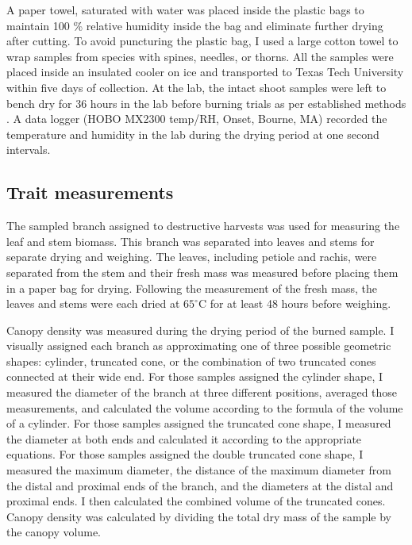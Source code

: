 \documentclass{ttuthes2007}
\begin{document}
A paper towel, saturated with water was placed inside the plastic bags to maintain 100 \% relative humidity inside the bag and eliminate further drying after cutting. To avoid puncturing the plastic bag, I used a large cotton towel to wrap samples from species with spines, needles, or thorns. All the samples were placed inside an insulated cooler on ice and transported to Texas Tech University within five days of collection.  %
At the lab, the intact shoot samples were left to bench dry for 36 hours in the lab before burning trials  as per established methods \citep{wyse2016quantitative}. 
A data logger (HOBO MX2300 temp/RH, Onset, Bourne, MA) recorded the temperature and humidity in the lab during the drying period at one second intervals.



\subsection{Trait measurements}
The sampled branch assigned to destructive harvests was used for measuring the leaf and stem biomass.
This branch was separated into leaves and stems for separate drying and weighing. The leaves, including petiole and rachis, were separated from the stem and their fresh mass was measured before placing them in a paper bag for drying. Following the measurement of the fresh mass, the leaves and stems were each dried at $65^{\circ}$C for at least 48 hours before weighing.

Canopy density was measured during the drying period of the burned sample. I visually assigned each branch as approximating one of three possible geometric shapes: cylinder, truncated cone, or the combination of two truncated cones connected at their wide end. For those samples assigned the cylinder shape, I measured the diameter of the branch at three different positions, averaged those measurements, and calculated the volume according to the formula of the volume of a cylinder. For those samples assigned the truncated cone shape, I measured the diameter at both ends and calculated it according to the appropriate equations. For those samples assigned the double truncated cone shape, I measured the maximum diameter, the distance of the maximum diameter from the distal and proximal ends of the branch, and the diameters at the distal and proximal ends. I then calculated the combined volume of the truncated cones. Canopy density was calculated by dividing the total dry mass of the sample by the canopy volume.
\end{document}
